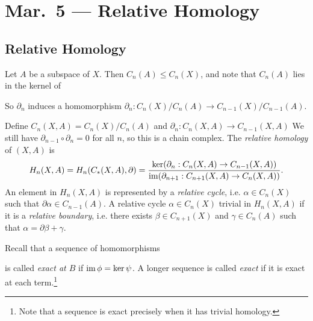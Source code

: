 \chapter{Mar.~5 --- Relative Homology}

\section{Relative Homology}
\begin{remark}
  Let $A$ be a subspace of $X$. Then $C_n(A) \le C_n(X)$,
  and note that $C_n(A)$ lies in the kernel of
  \begin{center}
  \end{center}
  So $\partial_n$ induces a homomorphism
  $\partial_n : C_n(X) / C_n(A) \to C_{n - 1}(X) / C_{n - 1}(A)$.
\end{remark}

\begin{definition}
  Define $C_n(X, A) = C_n(X) / C_n(A)$ and
  $\partial_n : C_n(X, A) \to C_{n - 1}(X, A)$
  We still have $\partial_{n - 1} \circ \partial_n = 0$
  for all $n$, so this is a chain complex.
  The \emph{relative homology} of $(X, A)$ is
  \[
    H_n(X, A)
    = H_n(C_*(X, A), \partial)
    = \frac{\ker(\partial_n : C_n(X, A) \to C_{n - 1}(X, A))}{\operatorname{im}(\partial_{n + 1} : C_{n + 1}(X, A) \to C_{n}(X, A))}.
  \]
  An element in $H_n(X, A)$ is represented by a
  \emph{relative cycle}, i.e. $\alpha \in C_n(X)$
  such that $\partial \alpha \in C_{n - 1}(A)$.
  A relative cycle $\alpha \in C_n(X)$ trivial
  in $H_n(X, A)$ if it is a \emph{relative boundary},
  i.e. there exists $\beta \in C_{n + 1}(X)$
  and $\gamma \in C_n(A)$ such that
  $\alpha = \partial \beta + \gamma$.
\end{definition}

\begin{definition}
  Recall that a sequence of homomorphisms
  \begin{center}
  \end{center}
  is called \emph{exact at $B$} if
  $\operatorname{im} \phi = \ker \psi$. A longer sequence is called
  \emph{exact} if it is exact at each term.\footnote{Note that a sequence is exact precisely when it has trivial homology.}
\end{definition}

